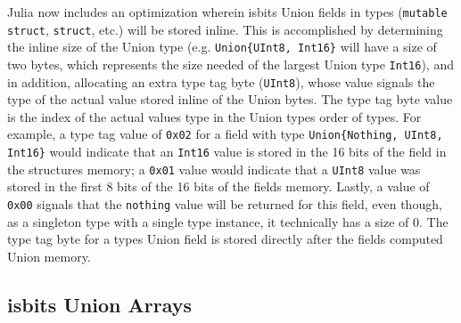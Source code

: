 Julia now includes an optimization wherein {\textquotedbl}isbits Union{\textquotedbl} fields in types (\texttt{mutable struct}, \texttt{struct}, etc.) will be stored inline. This is accomplished by determining the {\textquotedbl}inline size{\textquotedbl} of the Union type (e.g. \texttt{Union\{UInt8, Int16\}} will have a size of two bytes, which represents the size needed of the largest Union type \texttt{Int16}), and in addition, allocating an extra {\textquotedbl}type tag byte{\textquotedbl} (\texttt{UInt8}), whose value signals the type of the actual value stored inline of the {\textquotedbl}Union bytes{\textquotedbl}. The type tag byte value is the index of the actual value{\textquotesingle}s type in the Union type{\textquotesingle}s order of types. For example, a type tag value of \texttt{0x02} for a field with type \texttt{Union\{Nothing, UInt8, Int16\}} would indicate that an \texttt{Int16} value is stored in the 16 bits of the field in the structure{\textquotesingle}s memory; a \texttt{0x01} value would indicate that a \texttt{UInt8} value was stored in the first 8 bits of the 16 bits of the field{\textquotesingle}s memory. Lastly, a value of \texttt{0x00} signals that the \texttt{nothing} value will be returned for this field, even though, as a singleton type with a single type instance, it technically has a size of 0. The type tag byte for a type{\textquotesingle}s Union field is stored directly after the field{\textquotesingle}s computed Union memory.



\hypertarget{3119783438553475290}{}


\subsection{isbits Union Arrays}




